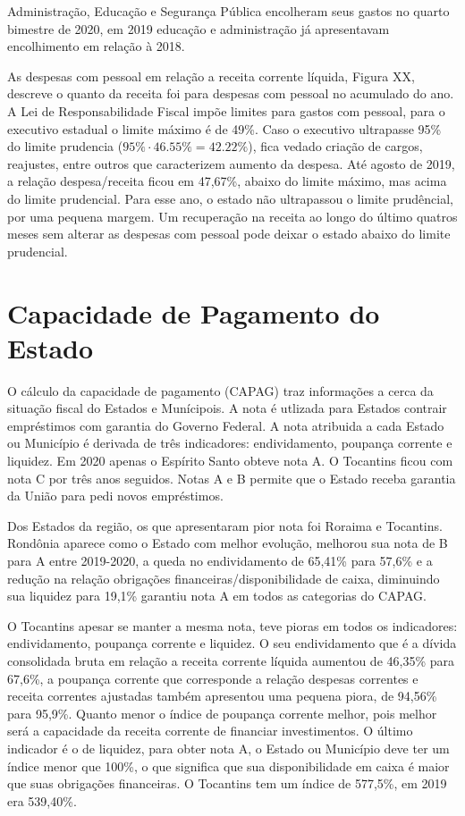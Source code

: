 Administração, Educação e Segurança Pública encolheram seus gastos no
quarto bimestre de 2020, em 2019 educação e administração já
apresentavam encolhimento em relação à 2018.

As despesas com pessoal em relação a receita corrente líquida, Figura
XX, descreve o quanto da receita foi para despesas com pessoal no
acumulado do ano. A Lei de Responsabilidade Fiscal impõe limites para
gastos com pessoal, para o executivo estadual o limite máximo é de 49\%.
Caso o executivo ultrapasse 95\% do limite prudencia
(\(95\%\cdot46.55\%=42.22\%\)), fica vedado criação de cargos,
reajustes, entre outros que caracterizem aumento da despesa. Até agosto
de 2019, a relação despesa/receita ficou em 47,67\%, abaixo do limite
máximo, mas acima do limite prudencial. Para esse ano, o estado não
ultrapassou o limite prudêncial, por uma pequena margem. Um recuperação
na receita ao longo do último quatros meses sem alterar as despesas com
pessoal pode deixar o estado abaixo do limite prudencial.

\hypertarget{capacidade-de-pagamento-do-estado}{%
\section{Capacidade de Pagamento do
Estado}\label{capacidade-de-pagamento-do-estado}}

O cálculo da capacidade de pagamento (CAPAG) traz informações a cerca da
situação fiscal do Estados e Munícipois. A nota é utlizada para Estados
contrair empréstimos com garantia do Governo Federal. A nota atribuida a
cada Estado ou Município é derivada de três indicadores: endividamento,
poupança corrente e liquidez. Em 2020 apenas o Espírito Santo obteve
nota A. O Tocantins ficou com nota C por três anos seguidos. Notas A e B
permite que o Estado receba garantia da União para pedi novos
empréstimos.

Dos Estados da região, os que apresentaram pior nota foi Roraima e
Tocantins. Rondônia aparece como o Estado com melhor evolução, melhorou
sua nota de B para A entre 2019-2020, a queda no endividamento de
65,41\% para 57,6\% e a redução na relação obrigações
financeiras/disponibilidade de caixa, diminuindo sua liquidez para
19,1\% garantiu nota A em todos as categorias do CAPAG.

O Tocantins apesar se manter a mesma nota, teve pioras em todos os
indicadores: endividamento, poupança corrente e liquidez. O seu
endividamento que é a dívida consolidada bruta em relação a receita
corrente líquida aumentou de 46,35\% para 67,6\%, a poupança corrente
que corresponde a relação despesas correntes e receita correntes
ajustadas também apresentou uma pequena piora, de 94,56\% para 95,9\%.
Quanto menor o índice de poupança corrente melhor, pois melhor será a
capacidade da receita corrente de financiar investimentos. O último
indicador é o de liquidez, para obter nota A, o Estado ou Município deve
ter um índice menor que 100\%, o que significa que sua disponibilidade
em caixa é maior que suas obrigações financeiras. O Tocantins tem um
índice de 577,5\%, em 2019 era 539,40\%.

